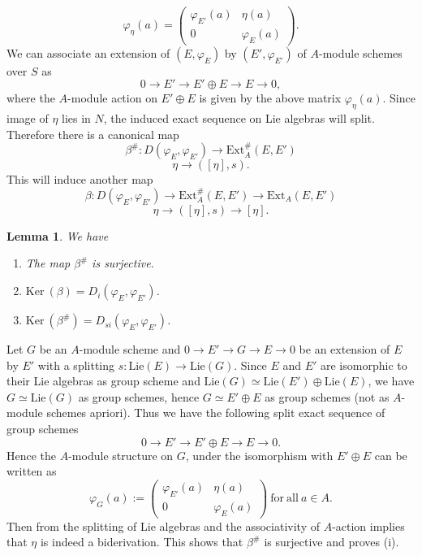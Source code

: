 \documentclass{amsart}
\newtheorem {lemma}[theorem] {\bf Lemma}
\numberwithin {equation}{section}
\begin{document}
\begin{equation*}
\varphi_{\eta}(a) = 
\begin{pmatrix}
\varphi_{E'}(a) & \eta(a) \\
0 & \varphi_{E}(a) 
\end{pmatrix}.
\end{equation*}
We can associate an extension of $(E,\varphi_{E})$ by $(E',\varphi_{E'})$ of $A$-module schemes over $S$ as 
\begin{equation*}
0\longrightarrow E' \longrightarrow E'\oplus E \longrightarrow E \longrightarrow 0,
\end{equation*}
where the $A$-module action on $E'\oplus E$ is given by the above matrix $\varphi_{\eta}(a)$. Since image of $\eta $ lies in $N$, the induced exact sequence on Lie algebras will split. Therefore there is a canonical map $$\beta^{\#}:D(\varphi_{E},\varphi_{E'})\longrightarrow \mathrm{Ext}^{\#}_{A}(E,E')$$  $$\eta \longrightarrow ([\eta],s) .$$
This will induce another map $$\beta:D(\varphi_{E},\varphi_{E'})\longrightarrow  \mathrm{Ext}^{\#}_{A}(E,E') \longrightarrow  \mathrm{Ext}_{A}(E,E')$$ $$ \eta \longrightarrow ([\eta],s)\longrightarrow [\eta].$$

\begin{lemma}\label{ext_bider} We have 

\begin{enumerate}
\item[(i)]The map $\beta^{\#}$ is surjective.
\item[(ii)] $\mathrm{Ker}~(\beta)=D_{i}(\varphi_{E},\varphi_{E'})$.
\item[(iii)]$\mathrm{Ker}~(\beta^{\#})=D_{si}(\varphi_{E},\varphi_{E'})$.
\end{enumerate}
\end{lemma}
\proof   Let $G$ be an $A$-module scheme and                                                                        
$0\longrightarrow E' \longrightarrow G \longrightarrow E \longrightarrow 0$ be an extension of $E$ by $E'$ with a splitting $s:\mathrm{Lie}(E)\longrightarrow \mathrm{Lie}(G)$. Since $E$ and $E'$ are isomorphic to their Lie algebras as group scheme and $\mathrm{Lie}(G)\simeq \mathrm{Lie}(E')\oplus \mathrm{Lie}(E)$, we have $G\simeq \mathrm{Lie}(G)$ as group schemes, hence $G\simeq E'\oplus E$ as group schemes (not as $A$-module schemes apriori). Thus we have the following split exact sequence of group schemes  $$0\longrightarrow E' \longrightarrow E'\oplus E \longrightarrow E \longrightarrow 0.$$ 
Hence the $A$-module structure on $G$, under the isomorphism with $E'\oplus E$ can be written as
\begin{equation*}
\varphi_{G}(a):= 
\begin{pmatrix}
\varphi_{E'}(a) & \eta(a) \\
0 & \varphi_{E}(a) 
\end{pmatrix} \ \mathrm{for ~ all}~ a\in A.
\end{equation*} 
Then from the splitting of Lie algebras and the associativity of $A$-action implies that $\eta$ is indeed a biderivation. This shows that $\beta^{\#}$ is surjective and proves (i). \medskip
\end{document}
